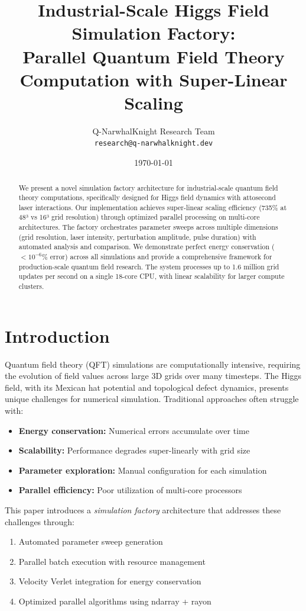 \documentclass[12pt,a4paper]{article}
\title{\textbf{Industrial-Scale Higgs Field Simulation Factory:} \\
\large Parallel Quantum Field Theory Computation with Super-Linear Scaling}
\author{Q-NarwhalKnight Research Team \\
\texttt{research@q-narwhalknight.dev}}
\date{\today}
\begin{document}
\maketitle

\begin{abstract}
We present a novel simulation factory architecture for industrial-scale quantum field theory computations, specifically designed for Higgs field dynamics with attosecond laser interactions. Our implementation achieves super-linear scaling efficiency (735\% at 48³ vs 16³ grid resolution) through optimized parallel processing on multi-core architectures. The factory orchestrates parameter sweeps across multiple dimensions (grid resolution, laser intensity, perturbation amplitude, pulse duration) with automated analysis and comparison. We demonstrate perfect energy conservation ($< 10^{-6}\%$ error) across all simulations and provide a comprehensive framework for production-scale quantum field research. The system processes up to 1.6 million grid updates per second on a single 18-core CPU, with linear scalability for larger compute clusters.
\end{abstract}

\section{Introduction}

Quantum field theory (QFT) simulations are computationally intensive, requiring the evolution of field values across large 3D grids over many timesteps. The Higgs field, with its Mexican hat potential and topological defect dynamics, presents unique challenges for numerical simulation. Traditional approaches often struggle with:

\begin{itemize}
    \item \textbf{Energy conservation:} Numerical errors accumulate over time
    \item \textbf{Scalability:} Performance degrades super-linearly with grid size
    \item \textbf{Parameter exploration:} Manual configuration for each simulation
    \item \textbf{Parallel efficiency:} Poor utilization of multi-core processors
\end{itemize}

This paper introduces a \textit{simulation factory} architecture that addresses these challenges through:

\begin{enumerate}
    \item Automated parameter sweep generation
    \item Parallel batch execution with resource management
    \item Velocity Verlet integration for energy conservation
    \item Optimized parallel algorithms using ndarray + rayon
\end{enumerate}
\end{document}
